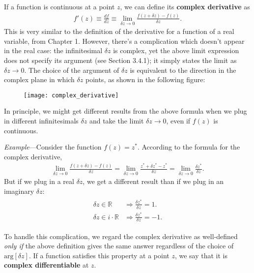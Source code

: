 \documentclass[10pt,a4paper]{article}
\begin{document}
If a function is continuous at a point $z$, we can define its
\textbf{complex derivative} as
\begin{align}
  f'(z) \equiv \frac{df}{dz} \equiv \lim_{\delta z\rightarrow 0} \frac{f(z+\delta z) - f(z)}{\delta z}.
\end{align}
This is very similar to the definition of the derivative for a
function of a real variable, from Chapter 1.  However, there's a
complication which doesn't appear in the real case: the infinitesimal
$\delta z$ is complex, yet the above limit expression does not specify
its argument (see Section 3.4.1); it simply states the limit as
$\delta z \rightarrow 0$.  The choice of the argument of $\delta z$ is
equivalent to the direction in the complex plane in which $\delta z$
points, as shown in the following figure:

\begin{figure}[ht]
  \centering\texttt{[image: complex\_derivative]}
\end{figure}

\clearpage

In principle, we might get different results from the above formula
when we plug in different infinitesimals $\delta z$ and take the limit
$\delta z \rightarrow 0$, even if $f(z)$ is continuous.

\begin{framed}\noindent
  \textit{Example}---Consider the function $f(z) = z^*$.  According to the formula for the complex derivative,
  \begin{align}
    \lim_{\delta z \rightarrow0} \frac{f(z+\delta z) - f(z)}{\delta z} = \lim_{\delta z \rightarrow0} \frac{z^*+\delta z^* - z^*}{\delta z} = \lim_{\delta z \rightarrow0} \frac{\delta z^*}{\delta z}.
  \end{align}
  But if we plug in a real $\delta z$, we get a different result than if we plug in an imaginary $\delta z$:
  \begin{align}
    \begin{aligned}\delta z \in \mathbb{R} \;\; &\Rightarrow \frac{\delta z^*}{\delta z} = 1.\\ \delta z \in i \cdot \mathbb{R} &\Rightarrow \frac{\delta z^*}{\delta z} = -1.\end{aligned}
  \end{align}
\end{framed}

To handle this complication, we regard the complex derivative as
well-defined \textit{only if} the above definition gives the same
answer regardless of the choice of $\mathrm{arg}[\delta z]$. If a
function satisfies this property at a point $z$, we say that it is
\textbf{complex differentiable} at $z$.
\end{document}
